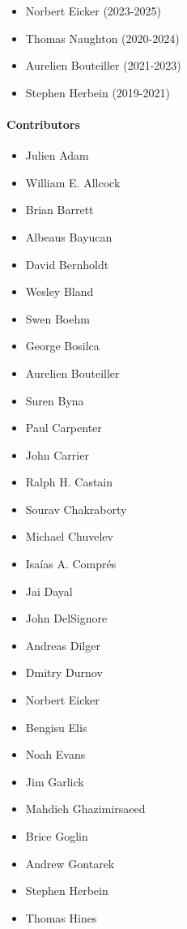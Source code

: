 \begin{itemize}
    \item Norbert Eicker (2023-2025)
    \item Thomas Naughton (2020-2024)
    \item Aurelien Bouteiller (2021-2023)
    \item Stephen Herbein (2019-2021)
\end{itemize}

\paragraph*{Contributors}

\begin{itemize}
    \item Julien Adam
    \item William E. Allcock
    \item Brian Barrett
    \item Albeaus Bayucan
    \item David Bernholdt
    \item Wesley Bland
    \item Swen Boehm
    \item George Bosilca
    \item Aurelien Bouteiller
    \item Suren Byna
    \item Paul Carpenter
    \item John Carrier
    \item Ralph H. Castain
    \item Sourav Chakraborty
    \item Michael Chuvelev
    \item Isaías A. Comprés
    \item Jai Dayal
    \item John DelSignore
    \item Andreas Dilger
    \item Dmitry Durnov
    \item Norbert Eicker
    \item Bengisu Elis
    \item Noah Evans
    \item Jim Garlick
    \item Mahdieh Ghazimirsaeed
    \item Brice Goglin
    \item Andrew Gontarek
    \item Stephen Herbein
    \item Thomas Hines

\end{itemize}
